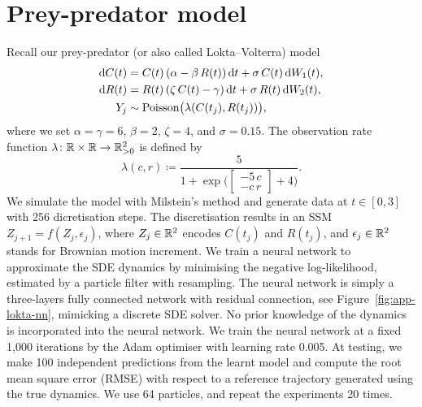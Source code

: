 \documentclass{article}
\begin{document}
\section{Prey-predator model}
\label{app:prey-predator}
Recall our prey-predator (or also called Lokta--Volterra) model
%
\begin{equation}
    \begin{split}
        \mathop{}\!\mathrm{d} C(t) &= C(t) \, (\alpha - \beta \, R(t)) \mathop{}\!\mathrm{d} t + \sigma \, C(t) \mathop{}\!\mathrm{d} W_{1}(t),\\
        \mathop{}\!\mathrm{d} R(t) &= R(t) \, (\zeta \, C(t) - \gamma) \mathop{}\!\mathrm{d} t + \sigma \, R(t) \mathop{}\!\mathrm{d} W_{2}(t), \\
        Y_j &\sim \mathrm{Poisson}\bigl(\lambda(C(t_j), R(t_j))\bigr),
    \end{split}
\end{equation}
%
where we set $\alpha=\gamma=6$, $\beta=2$, $\zeta=4$, and $\sigma=0.15$. 
The observation rate function $\lambda\colon \mathbb{R}\times\mathbb{R}\to\mathbb{R}^2_{>0}$ is defined by
%
\begin{equation}
    \lambda(c, r) \coloneqq \frac{5}{1 + \exp\Biggl(\begin{bmatrix} -5\, c \\ - c \, r\end{bmatrix} + 4 \Biggr) }.
\end{equation}
%
We simulate the model with Milstein's method and generate data at $t\in[0, 3]$ with 256 dicretisation steps. 
The discretisation results in an SSM $Z_{j+1} = f(Z_j, \epsilon_j)$, where $Z_j\in\mathbb{R}^2$ encodes $C(t_j)$ and $R(t_j)$, and $\epsilon_j\in\mathbb{R}^2$ stands for Brownian motion increment. 
We train a neural network to approximate the SDE dynamics by minimising the negative log-likelihood, estimated by a particle filter with resampling. 
The neural network is simply a three-layers fully connected network with residual connection, see Figure~\ref{fig:app-lokta-nn}, mimicking a discrete SDE solver. 
No prior knowledge of the dynamics is incorporated into the neural network. 
We train the neural network at a fixed 1,000 iterations by the Adam optimiser with learning rate 0.005.
At testing, we make 100 independent predictions from the learnt model and compute the root mean square error (RMSE) with respect to a reference trajectory generated using the true dynamics. 
We use 64 particles, and repeat the experiments 20 times. 
\end{document}

